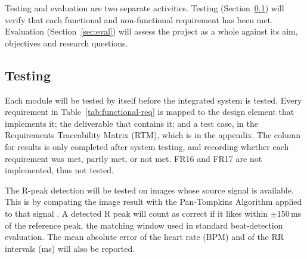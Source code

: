Testing and evaluation are two separate activities. Testing (Section~\ref{sec:testing}) will verify that each functional and non-functional requirement has been met. Evaluation (Section~\ref{sec:eval}) will assess the project as a whole against its aim, objectives and research questions.
\subsection{Testing}
\label{sec:testing}

Each module will be tested by itself before the integrated system is tested. Every requirement in Table~\ref{tab:functional-req} is mapped to the design element that implements it; the deliverable that contains it; and a test case, in the Requirements Traceability Matrix (RTM), which is in the appendix. The column for results is only completed after system testing, and recording whether each requirement was met, partly met, or not met. FR16 and FR17 are not implemented, thus not tested.

The R-peak detection will be tested on images whose source signal is available. This is by compating the image result with the Pan-Tompkins Algorithm applied to that signal \cite{pan_real-time_1985}. A detected R peak will count as correct if it likes within $\pm150$\,ms of the reference peak, the matching window used in standard beat-detection evaluation. The mean absolute error of the heart rate (BPM) and of the RR intervals (ms) will also be reported.


